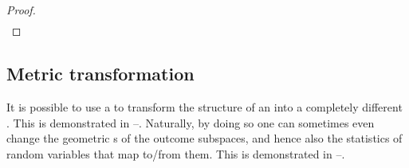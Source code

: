 \begin{tabstr}{0.75}
\begin{proof}
\begin{align*}
    \end{align*}
\end{proof}


\subsection{Metric transformation}
It is possible to use a   to transform the structure of an 
  into a completely different . 
This is demonstrated in --.
Naturally, by doing so one can sometimes even change the geometric s 
of the outcome subspaces, and hence also the statistics of random variables that map to/from them.
This is demonstrated in --.


\end{tabstr}
